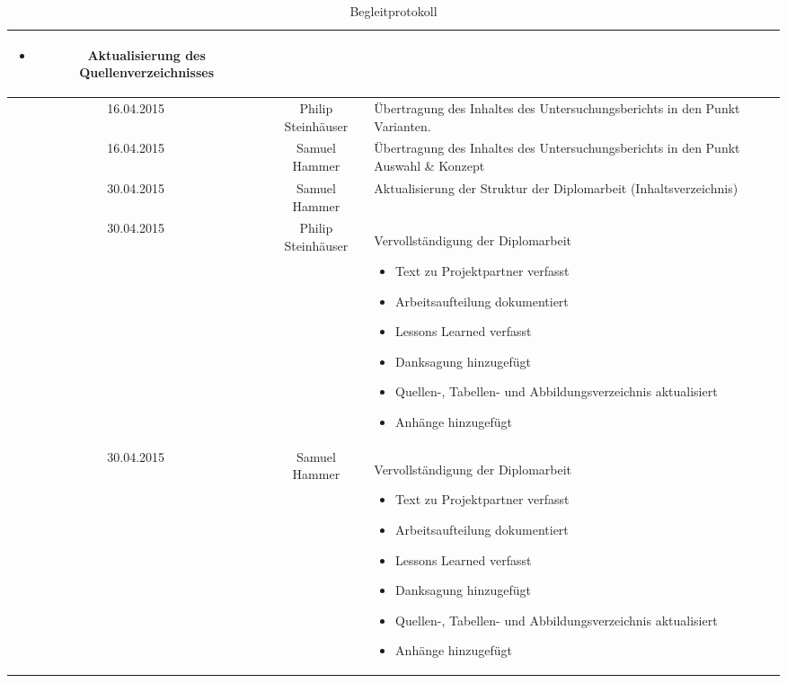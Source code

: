 \begin{table}
\begin{tabular}{| c | c | p{6cm} | p{4cm} |}
\begin{itemize}
			\item Aktualisierung des Quellenverzeichnisses
		\end{itemize}
		&%
		\\\hline %
		16.04.2015
		&%
		Philip Steinhäuser
		&%
		Übertragung des Inhaltes des Untersuchungsberichts in den Punkt Varianten.
		&%
		\\\hline %
		16.04.2015
		&%
		Samuel Hammer
		&%
		Übertragung des Inhaltes des Untersuchungsberichts in den Punkt Auswahl \& Konzept
		&%
		\\\hline %
		30.04.2015
		&%
		Samuel Hammer
		&%
		Aktualisierung der Struktur der Diplomarbeit (Inhaltsverzeichnis)
		&%
		\\\hline %
		30.04.2015
		&%
		Philip Steinhäuser
		&%
		Vervollständigung der Diplomarbeit
		\begin{itemize}
			\item Text zu Projektpartner verfasst
			\item Arbeitsaufteilung dokumentiert
			\item Lessons Learned verfasst
			\item Danksagung hinzugefügt
			\item Quellen-, Tabellen- und Abbildungsverzeichnis aktualisiert
			\item Anhänge hinzugefügt
		\end{itemize}
		&%
		\\\hline %
		30.04.2015
		&%
		Samuel Hammer
		&%
		Vervollständigung der Diplomarbeit
		\begin{itemize}
			\item Text zu Projektpartner verfasst
			\item Arbeitsaufteilung dokumentiert
			\item Lessons Learned verfasst
			\item Danksagung hinzugefügt
			\item Quellen-, Tabellen- und Abbildungsverzeichnis aktualisiert
			\item Anhänge hinzugefügt
		\end{itemize}
		&%
		\\\hline %
	\end{tabular}
	\caption{Begleitprotokoll}
\end{table}